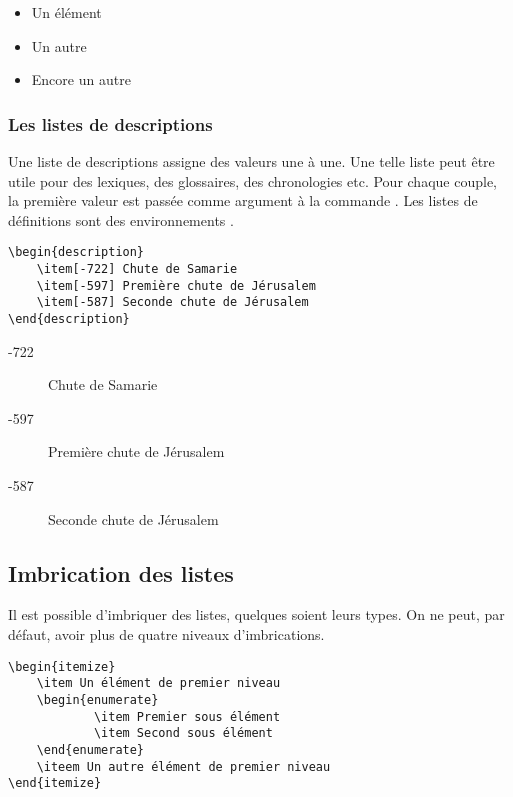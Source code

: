 \begin{itemize}
	\item Un élément
	\item Un autre
	\item Encore un autre
\end{itemize}

\subsubsection{Les listes de descriptions}

Une liste de descriptions assigne des valeurs une à une. Une telle liste peut être utile pour des lexiques, des glossaires, des chronologies etc. Pour chaque couple, la première valeur est passée comme argument à la commande . Les listes de définitions sont des environnements .


\begin{verbatim}
\begin{description}
	\item[-722] Chute de Samarie
	\item[-597] Première chute de Jérusalem
	\item[-587] Seconde chute de Jérusalem
\end{description}
\end{verbatim}

\begin{description}
	\item[-722] Chute de Samarie
	\item[-597] Première chute de Jérusalem
	\item[-587] Seconde chute de Jérusalem
\end{description}

\subsection{Imbrication des listes}

Il est possible d'imbriquer des listes, quelques soient leurs types. On ne peut, par défaut, avoir plus de quatre niveaux d'imbrications.

\begin{verbatim}
\begin{itemize}
	\item Un élément de premier niveau
	\begin{enumerate}
			\item Premier sous élément
			\item Second sous élément
	\end{enumerate}
	\iteem Un autre élément de premier niveau
\end{itemize}
\end{verbatim}


